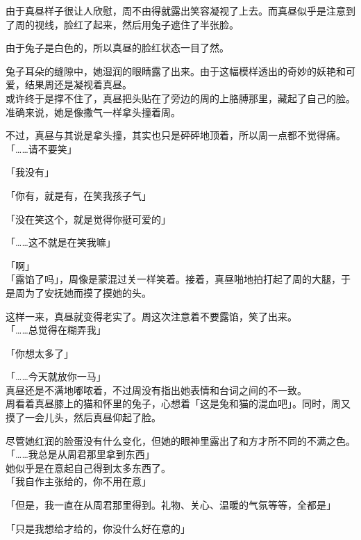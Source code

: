 由于真昼样子很让人欣慰，周不由得就露出笑容凝视了上去。而真昼似乎是注意到了周的视线，脸红了起来，然后用兔子遮住了半张脸。

由于兔子是白色的，所以真昼的脸红状态一目了然。

兔子耳朵的缝隙中，她湿润的眼睛露了出来。由于这幅模样透出的奇妙的妖艳和可爱，结果周还是凝视着真昼。\\

或许终于是撑不住了，真昼把头贴在了旁边的周的上胳膊那里，藏起了自己的脸。准确来说，她是像撒气一样拿头撞着周。

不过，真昼与其说是拿头撞，其实也只是砰砰地顶着，所以周一点都不觉得痛。\\

「……请不要笑」

「我没有」

「你有，就是有，在笑我孩子气」

「没在笑这个，就是觉得你挺可爱的」

「……这不就是在笑我嘛」

「啊」\\

「露馅了吗」，周像是蒙混过关一样笑着。接着，真昼啪地拍打起了周的大腿，于是周为了安抚她而摸了摸她的头。

这样一来，真昼就变得老实了。周这次注意着不要露馅，笑了出来。\\

「……总觉得在糊弄我」

「你想太多了」

「……今天就放你一马」\\

真昼还是不满地嘟哝着，不过周没有指出她表情和台词之间的不一致。\\

周看着真昼膝上的猫和怀里的兔子，心想着「这是兔和猫的混血吧」。同时，周又摸了一会儿头，然后真昼仰起了脸。

尽管她红润的脸蛋没有什么变化，但她的眼神里露出了和方才所不同的不满之色。\\

「……我总是从周君那里拿到东西」\\

她似乎是在意起自己得到太多东西了。\\

「我自作主张给的，你不用在意」

「但是，我一直在从周君那里得到。礼物、关心、温暖的气氛等等，全都是」

「只是我想给才给的，你没什么好在意的」\\

